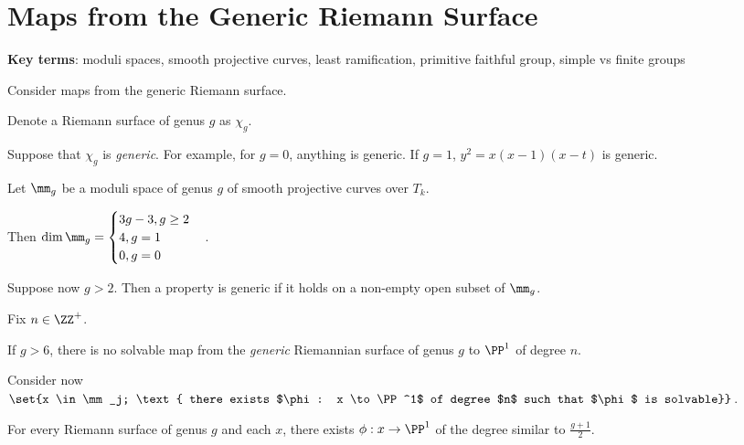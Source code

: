 \documentclass[11pt]{scrartcl}
\begin{document}
\section{Maps from the Generic Riemann Surface}

\textbf{Key terms}: moduli spaces, smooth projective curves, least
ramification, primitive faithful group, simple vs finite groups

Consider maps from the generic Riemann surface.

Denote a Riemann surface of genus $g$ as $\chi_g$.

Suppose that $\chi_g$ is \textit{generic}. For example, for $g = 0$,
anything is generic. If $g = 1$, $y^2 = x(x-1)(x-t)$ is generic.

Let $\mm_g$ be a moduli space of genus $g$ of smooth projective curves
over $T_k$.

Then $\dim \mm_g = 
\begin{cases}
  3g - 3, g \geq 2\\
  4, g = 1\\
  0, g = 0
\end{cases}
$.

Suppose now $g > 2 $. Then a property is generic if it holds on a
non-empty open subset of $\mm_g$.

\begin{theorem}

Fix $n\in \ZZ^+$.

If $g > 6$, there is no solvable map from the \textit{generic}
Riemannian surface of genus $g$ to $\PP^1$ of degree $n$.

Consider now $\set{x \in \mm_j; \text{ there exists
    $\phi: x \to \PP^1$ of degree $n$ such that $\phi$ is solvable}}$.
\begin{remark}
  For every Riemann surface of genus $g$ and each $x$, there exists
  $\phi:x\to \PP^1$ of the degree similar to $\frac{g+1}{2}$.
\end{remark}

\end{theorem}
\end{document}
